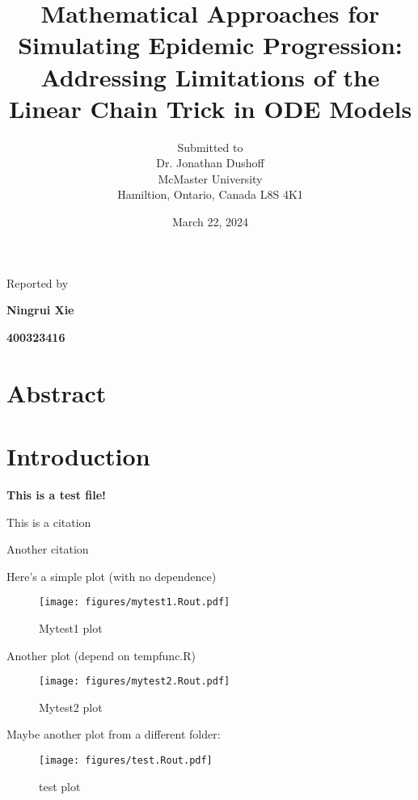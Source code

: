 \documentclass[12pt]{article}
\begin{document}
\title{Mathematical Approaches for Simulating Epidemic Progression: Addressing Limitations of the Linear Chain Trick in ODE Models}

\author{Submitted to\\ Dr. Jonathan Dushoff 
\\McMaster University\\Hamiltion, Ontario, Canada L8S 4K1}
\date {March 22, 2024}
\maketitle


\centerline{Reported by}
\centerline{\textbf{Ningrui Xie}}
\centerline{\textbf{400323416}}


\newpage
\section{Abstract}

\section{Introduction}
\textbf{This is a test file!} 

This is a citation \cite{Feng2016}

Another citation \cite{Anderson1991} 

Here's a simple plot (with no dependence)

\begin{figure}[h]
    \centering
    \texttt{[image: figures/mytest1.Rout.pdf]}
    \caption{Mytest1 plot}
\end{figure}


Another plot (depend on tempfunc.R)

\begin{figure}[h]
    \centering
    \texttt{[image: figures/mytest2.Rout.pdf]}
    \caption{Mytest2 plot}
\end{figure}

Maybe another plot from a different folder:

\begin{figure}[h]
    \centering
    \texttt{[image: figures/test.Rout.pdf]}
    \caption{test plot}
\end{figure}






 
\end{document}
